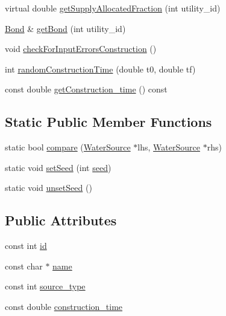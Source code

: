 \begin{DoxyCompactItemize}
virtual double \mbox{\hyperlink{classWaterSource_a71cb8bd481bbce0089aa78dcd1c3309a}{get\+Supply\+Allocated\+Fraction}} (int utility\+\_\+id)
\item 
\mbox{\hyperlink{classBond}{Bond}} \& \mbox{\hyperlink{classWaterSource_a22f89ebf1115de192df588a4fd83c671}{get\+Bond}} (int utility\+\_\+id)
\item 
void \mbox{\hyperlink{classWaterSource_a47bc2006a1ef6ea4429d56a24319940f}{check\+For\+Input\+Errors\+Construction}} ()
\item 
int \mbox{\hyperlink{classWaterSource_aebc6985952d3e69f0d8ae1d0498a1ffe}{random\+Construction\+Time}} (double t0, double tf)
\item 
const double \mbox{\hyperlink{classWaterSource_ac1e8880f0aeb56b2728e253d3500ef40}{get\+Construction\+\_\+time}} () const
\end{DoxyCompactItemize}
\subsection*{Static Public Member Functions}
\begin{DoxyCompactItemize}
\item 
static bool \mbox{\hyperlink{classWaterSource_a7a1325107c74bb0ea553dc3547204e01}{compare}} (\mbox{\hyperlink{classWaterSource}{Water\+Source}} $\ast$lhs, \mbox{\hyperlink{classWaterSource}{Water\+Source}} $\ast$rhs)
\item 
static void \mbox{\hyperlink{classWaterSource_a741c60afc9dafaae318ce7c99f4fd327}{set\+Seed}} (int \mbox{\hyperlink{classWaterSource_abaf6cb0ecca08c87428ad516f11f8c2e}{seed}})
\item 
static void \mbox{\hyperlink{classWaterSource_a4bd60dafcc0b18f1c7a415f489bb220a}{unset\+Seed}} ()
\end{DoxyCompactItemize}
\subsection*{Public Attributes}
\begin{DoxyCompactItemize}
\item 
const int \mbox{\hyperlink{classWaterSource_a6eafe5dfefd317877d1244e8a7c6e742}{id}}
\item 
const char $\ast$ \mbox{\hyperlink{classWaterSource_a846ea74c5b453d014f594d41fee8c765}{name}}
\item 
const int \mbox{\hyperlink{classWaterSource_afdd12c29fc74ea21dff1f1be9b8c2b7b}{source\+\_\+type}}
\item 
const double \mbox{\hyperlink{classWaterSource_ae059fbe3f911a819bac0202f7f45e8e4}{construction\+\_\+time}}
\end{DoxyCompactItemize}
